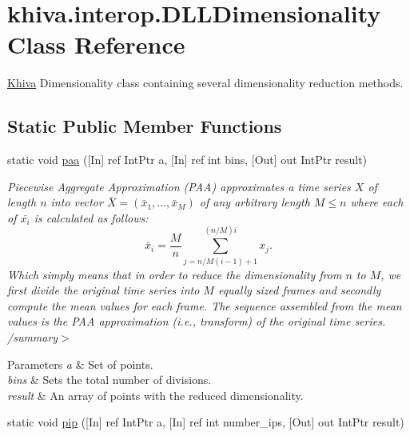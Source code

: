 \hypertarget{classkhiva_1_1interop_1_1_d_l_l_dimensionality}{}\section{khiva.\+interop.\+D\+L\+L\+Dimensionality Class Reference}
\label{classkhiva_1_1interop_1_1_d_l_l_dimensionality}


\mbox{\hyperlink{classkhiva_1_1_khiva}{Khiva}} Dimensionality class containing several dimensionality reduction methods.  


\subsection*{Static Public Member Functions}
\begin{DoxyCompactItemize}
\item 
static void \mbox{\hyperlink{classkhiva_1_1interop_1_1_d_l_l_dimensionality_a4c419ec83c5c61c775ed3b3fc2940517}{paa}} (\mbox{[}In\mbox{]} ref Int\+Ptr a, \mbox{[}In\mbox{]} ref int bins, \mbox{[}Out\mbox{]} out Int\+Ptr result)
\begin{DoxyCompactList}\small\item\em Piecewise Aggregate Approximation (P\+AA) approximates a time series $X$ of length $n$ into vector $\bar{X}=(\bar{x}_{1},…,\bar{x}_{M})$ of any arbitrary length $M \leq n$ where each of $\bar{x_{i}}$ is calculated as follows\+: \[ \bar{x}_{i} = \frac{M}{n} \sum_{j=n/M(i-1)+1}^{(n/M)i} x_{j}. \] Which simply means that in order to reduce the dimensionality from $n$ to $M$, we first divide the original time series into $M$ equally sized frames and secondly compute the mean values for each frame. The sequence assembled from the mean values is the P\+AA approximation (i.\+e., transform) of the original time series. /summary$>$ 
\begin{DoxyParams}{Parameters}
{\em a} & Set of points.\\
\hline
{\em bins} & Sets the total number of divisions.\\
\hline
{\em result} & An array of points with the reduced dimensionality.\\
\hline
\end{DoxyParams}
\end{DoxyCompactList}\item 
static void \mbox{\hyperlink{classkhiva_1_1interop_1_1_d_l_l_dimensionality_af5114c22229f13307ec0d9c9ac1a791a}{pip}} (\mbox{[}In\mbox{]} ref Int\+Ptr a, \mbox{[}In\mbox{]} ref int number\+\_\+ips, \mbox{[}Out\mbox{]} out Int\+Ptr result)

\end{DoxyCompactItemize}
